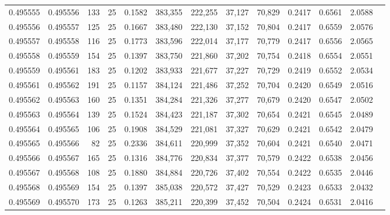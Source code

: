 \begin{tabular}{rrrrrrrrrrrrr}
0.495555 & 0.495556 &   133 &  25 &                                     0.1582 & 383,355 & 222,255 &  37,127 &  70,829 & 0.2417 & 0.6561 & 2.0588 \\
0.495556 & 0.495557 &   125 &  25 &                                     0.1667 & 383,480 & 222,130 &  37,152 &  70,804 & 0.2417 & 0.6559 & 2.0576 \\
0.495557 & 0.495558 &   116 &  25 &                                     0.1773 & 383,596 & 222,014 &  37,177 &  70,779 & 0.2417 & 0.6556 & 2.0565 \\
0.495558 & 0.495559 &   154 &  25 &                                     0.1397 & 383,750 & 221,860 &  37,202 &  70,754 & 0.2418 & 0.6554 & 2.0551 \\
0.495559 & 0.495561 &   183 &  25 &                                     0.1202 & 383,933 & 221,677 &  37,227 &  70,729 & 0.2419 & 0.6552 & 2.0534 \\
0.495561 & 0.495562 &   191 &  25 &                                     0.1157 & 384,124 & 221,486 &  37,252 &  70,704 & 0.2420 & 0.6549 & 2.0516 \\
0.495562 & 0.495563 &   160 &  25 &                                     0.1351 & 384,284 & 221,326 &  37,277 &  70,679 & 0.2420 & 0.6547 & 2.0502 \\
0.495563 & 0.495564 &   139 &  25 &                                     0.1524 & 384,423 & 221,187 &  37,302 &  70,654 & 0.2421 & 0.6545 & 2.0489 \\
0.495564 & 0.495565 &   106 &  25 &                                     0.1908 & 384,529 & 221,081 &  37,327 &  70,629 & 0.2421 & 0.6542 & 2.0479 \\
0.495565 & 0.495566 &    82 &  25 &                                     0.2336 & 384,611 & 220,999 &  37,352 &  70,604 & 0.2421 & 0.6540 & 2.0471 \\
0.495566 & 0.495567 &   165 &  25 &                                     0.1316 & 384,776 & 220,834 &  37,377 &  70,579 & 0.2422 & 0.6538 & 2.0456 \\
0.495567 & 0.495568 &   108 &  25 &                                     0.1880 & 384,884 & 220,726 &  37,402 &  70,554 & 0.2422 & 0.6535 & 2.0446 \\
0.495568 & 0.495569 &   154 &  25 &                                     0.1397 & 385,038 & 220,572 &  37,427 &  70,529 & 0.2423 & 0.6533 & 2.0432 \\
0.495569 & 0.495570 &   173 &  25 &                                     0.1263 & 385,211 & 220,399 &  37,452 &  70,504 & 0.2424 & 0.6531 & 2.0416 \\

\end{tabular}
